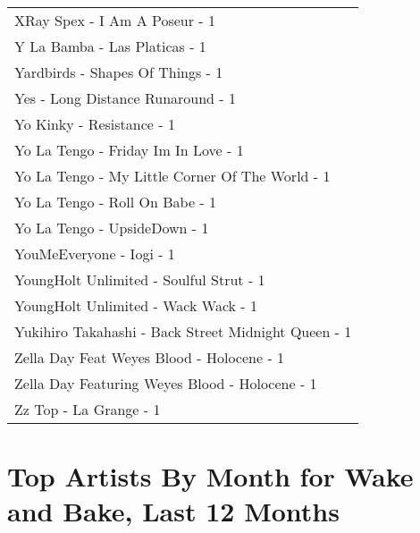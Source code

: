 \documentclass[
]{article}
\begin{document}
\begin{longtable}{l}
XRay Spex - I Am A Poseur - 1 \\ 
Y La Bamba - Las Platicas - 1 \\ 
Yardbirds - Shapes Of Things - 1 \\ 
Yes - Long Distance Runaround - 1 \\ 
Yo Kinky - Resistance - 1 \\ 
Yo La Tengo - Friday Im In Love - 1 \\ 
Yo La Tengo - My Little Corner Of The World - 1 \\ 
Yo La Tengo - Roll On Babe - 1 \\ 
Yo La Tengo - UpsideDown - 1 \\ 
YouMeEveryone - Iogi - 1 \\ 
YoungHolt Unlimited - Soulful Strut - 1 \\ 
YoungHolt Unlimited - Wack Wack - 1 \\ 
Yukihiro Takahashi - Back Street Midnight Queen - 1 \\ 
Zella Day Feat Weyes Blood - Holocene - 1 \\ 
Zella Day Featuring Weyes Blood - Holocene - 1 \\ 
Zz Top - La Grange - 1 \\ 
 \bottomrule
\end{longtable}
\newpage

\hypertarget{top-artists-by-month-for-wake-and-bake-last-12-months}{%
\section{Top Artists By Month for Wake and Bake, Last 12
Months}\label{top-artists-by-month-for-wake-and-bake-last-12-months}}
\end{document}
